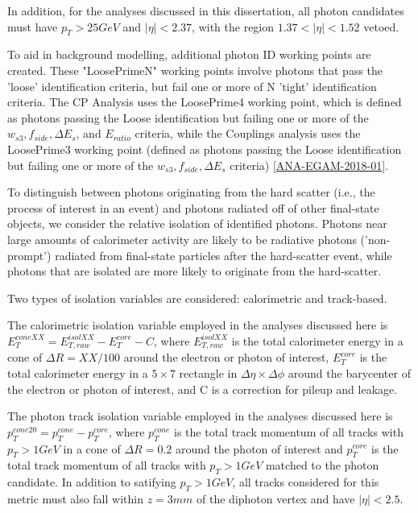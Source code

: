 In addition, for the analyses discussed in this dissertation, all photon candidates must have $p_{T} > 25 GeV$ and $|\eta| < 2.37$, with the region $1.37 < |\eta| < 1.52$ vetoed. 

To aid in background modelling, additional photon ID working points are created. These "LoosePrimeN" working points involve photons that pass the 'loose' identification criteria, but fail one or more of N 'tight' identification criteria. The CP Analysis uses the LoosePrime4 working point, which is defined as photons passing the Loose identification but failing one or more of the $w_{s3}, f_{side}, \Delta E_{s}$, and $E_{ratio}$ criteria, while the Couplings analysis uses the LoosePrime3 working point (defined as photons passing the Loose identification but failing one or more of the $w_{s3}, f_{side}, \Delta E_{s}$ criteria) \ref{ANA-EGAM-2018-01}.

To distinguish between photons originating from the hard scatter (i.e., the process of interest in an event) and photons radiated off of other final-state objects, we consider the relative isolation of identified photons. Photons near large amounts of calorimeter activity are likely to be radiative photons ('non-prompt') radiated from final-state particles after the hard-scatter event, while photons that are isolated are more likely to originate from the hard-scatter.

Two types of isolation variables are considered: calorimetric and track-based.

The calorimetric isolation variable employed in the analyses discussed here is $E_{T}^{coneXX} = E_{T,raw}^{isolXX} -E_{T}^{core} - C$, where $E_{T,raw}^{isolXX}$ is the total calorimeter energy in a cone of $\Delta R = XX/100 $ around the electron or photon of interest, $E_{T}^{core}$ is the total calorimeter energy in a $5 \times 7$ rectangle in $\Delta \eta \times \Delta \phi$ around the barycenter of the electron or photon of interest, and C is a correction for pileup and leakage.

The photon track isolation variable employed in the analyses discussed here is $p_{T}^{cone20} = p_{T}^{cone} - p_{T}^{core}$, where $p_{T}^{cone}$ is the total track momentum of all tracks with $p_{T} > 1GeV$ in a cone of $\Delta R = 0.2$ around the photon of interest and $p_{T}^{core}$ is the total track momentum of all tracks with $p_{T} > 1GeV$ matched to the photon candidate. In addition to satifying $p_{T} > 1GeV$, all tracks considered for this metric must also fall within $z= 3mm$ of the diphoton vertex and have $|\eta|<2.5$.

